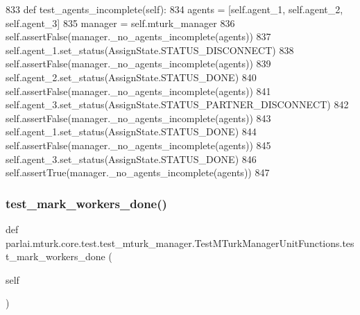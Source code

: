 \begin{DoxyCode}
833     \textcolor{keyword}{def }test\_agents\_incomplete(self):
834         agents = [self.agent\_1, self.agent\_2, self.agent\_3]
835         manager = self.mturk\_manager
836         self.assertFalse(manager.\_no\_agents\_incomplete(agents))
837         self.agent\_1.set\_status(AssignState.STATUS\_DISCONNECT)
838         self.assertFalse(manager.\_no\_agents\_incomplete(agents))
839         self.agent\_2.set\_status(AssignState.STATUS\_DONE)
840         self.assertFalse(manager.\_no\_agents\_incomplete(agents))
841         self.agent\_3.set\_status(AssignState.STATUS\_PARTNER\_DISCONNECT)
842         self.assertFalse(manager.\_no\_agents\_incomplete(agents))
843         self.agent\_1.set\_status(AssignState.STATUS\_DONE)
844         self.assertFalse(manager.\_no\_agents\_incomplete(agents))
845         self.agent\_3.set\_status(AssignState.STATUS\_DONE)
846         self.assertTrue(manager.\_no\_agents\_incomplete(agents))
847 
\end{DoxyCode}
\mbox{\label{classparlai_1_1mturk_1_1core_1_1test_1_1test__mturk__manager_1_1TestMTurkManagerUnitFunctions_a3eb6343f438b2bc7dcedee55c68363ad}} 
\subsubsection{\texorpdfstring{test\+\_\+mark\+\_\+workers\+\_\+done()}{test\_mark\_workers\_done()}}
{\footnotesize\ttfamily def parlai.\+mturk.\+core.\+test.\+test\+\_\+mturk\+\_\+manager.\+Test\+M\+Turk\+Manager\+Unit\+Functions.\+test\+\_\+mark\+\_\+workers\+\_\+done (\begin{DoxyParamCaption}\item[{}]{self }\end{DoxyParamCaption})}



